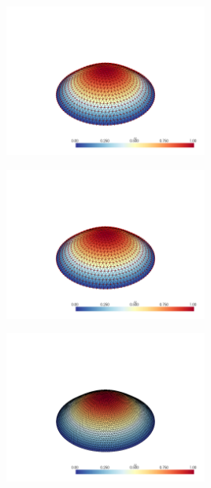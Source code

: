 \documentclass[
  11pt,
]{article}
\let\origfigure\figure
\let\endorigfigure\endfigure
\renewenvironment{figure}[1][2] {
    \expandafter\origfigure\expandafter[H]
} {
    \endorigfigure
}
\begin{document}
\begin{figure}
\centering
\includegraphics[width=0.5\textwidth,height=\textheight]{../img/mesh3-gauss13-b.png}
\caption{Finite element solution for problem 1 over mesh number 3 and
order-13 numerical integration.}
\end{figure}

\begin{figure}
\centering
\includegraphics[width=0.5\textwidth,height=\textheight]{../img/mesh3-gauss19-b.png}
\caption{Finite element solution for problem 1 over mesh number 3 and
order-19 numerical integration.}
\end{figure}

\begin{figure}
\centering
\includegraphics[width=0.5\textwidth,height=\textheight]{../img/mesh4-gauss02-b.png}
\caption{Finite element solution for problem 1 over mesh number 4 and
order-2 numerical integration.}
\end{figure}
\end{document}
